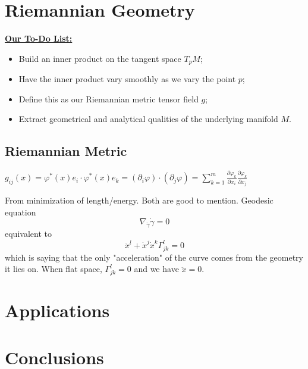 \documentclass[UKenglish]{beamer}
\begin{document}
\begin{frame}{}
\vfill
\begin{figure}[H]
	\centering
	\def\svgwidth{\columnwidth}
	
\end{figure}
\vfill
\end{frame}

\begin{frame}{}
\vfill
\begin{figure}[H]
	\centering
	\def\svgwidth{\columnwidth}
	
\end{figure}
\vfill
\end{frame}

\section{Riemannian Geometry}

\begin{frame}{}
\vfill
\textbf{\underline{Our To-Do List:}}
\begin{itemize}
	\item Build an inner product on the tangent space $T_pM$;
	\pause
	\item Have the inner product vary smoothly as we vary the point $p$;
	\pause
	\item Define this as our Riemannian metric tensor field $g$;
	\pause
	\item Extract geometrical and analytical qualities of the underlying manifold $M$.
\end{itemize}
\vfill
\end{frame}


\subsection{Riemannian Metric}

\begin{frame}{}
\vfill
$g_{ij}(x) = \varphi^*(x)e_i \cdot \varphi^*(x)e_k = (\partial_i \varphi)\cdot (\partial_j \varphi) = \sum_{k=1}^m \frac{\partial \varphi_k}{\partial x_i}\frac{\partial \varphi_k}{\partial x_j}$
\vfill
\end{frame}

\begin{frame}{}

\end{frame}


\begin{frame}{}
	From minimization of length/energy. Both are good to mention.	Geodesic equation
	\[
	\nabla_{\dot{\gamma}} \dot{\gamma}=0
	\]
	equivalent to
	\[
	\ddot{x}^l + \dot{x}^j\dot{x}^k \Gamma_{jk}^l=0
	\]
	which is saying that the only "acceleration" of the curve comes from the geometry it lies on. When flat space, $\Gamma_{jk}^l=0$ and we have $\ddot{x}=0$.
\end{frame}




\section{Applications}









\section{Conclusions}
\end{document}
